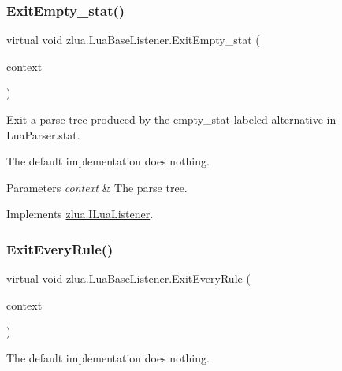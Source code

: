 \subsubsection{\texorpdfstring{Exit\+Empty\+\_\+stat()}{ExitEmpty\_stat()}}
{\footnotesize\ttfamily virtual void zlua.\+Lua\+Base\+Listener.\+Exit\+Empty\+\_\+stat (\begin{DoxyParamCaption}\item[{\mbox{[}\+Not\+Null\mbox{]} \mbox{\hyperlink{classzlua_1_1_lua_parser_1_1_empty__stat_context}{Lua\+Parser.\+Empty\+\_\+stat\+Context}}}]{context }\end{DoxyParamCaption})\hspace{0.3cm}{\ttfamily [virtual]}}



Exit a parse tree produced by the {\ttfamily empty\+\_\+stat} labeled alternative in Lua\+Parser.\+stat. 

The default implementation does nothing.


\begin{DoxyParams}{Parameters}
{\em context} & The parse tree.\\
\hline
\end{DoxyParams}


Implements \mbox{\hyperlink{interfacezlua_1_1_i_lua_listener_a5d6586f89158ceb4a9e683bbc2463ef3}{zlua.\+I\+Lua\+Listener}}.

\mbox{\label{classzlua_1_1_lua_base_listener_a06107a9f8d26fc9fdc1f7364074d8d05}} 
\subsubsection{\texorpdfstring{Exit\+Every\+Rule()}{ExitEveryRule()}}
{\footnotesize\ttfamily virtual void zlua.\+Lua\+Base\+Listener.\+Exit\+Every\+Rule (\begin{DoxyParamCaption}\item[{\mbox{[}\+Not\+Null\mbox{]} Parser\+Rule\+Context}]{context }\end{DoxyParamCaption})\hspace{0.3cm}{\ttfamily [virtual]}}

The default implementation does nothing.\mbox{\label{classzlua_1_1_lua_base_listener_aa397d17db00c6af6db3c06a7a35da3c8}} 
